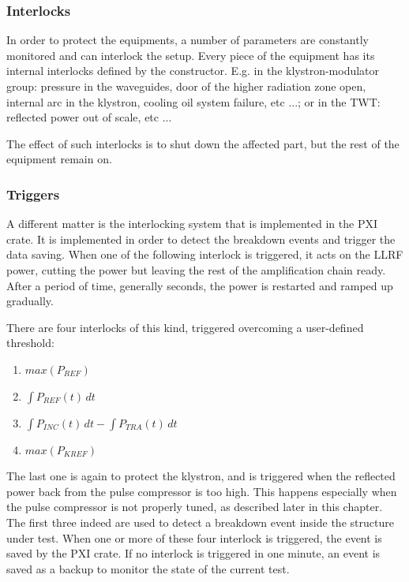 \subsubsection{Interlocks}

In order to protect the equipments, a number of parameters are constantly monitored and can interlock the setup. Every piece of the equipment has its internal interlocks defined by the constructor. E.g. in the klystron-modulator group: pressure in the waveguides, door of the higher radiation zone open, internal arc in the klystron, cooling oil system failure, etc ...; or in the TWT: reflected power out of scale, etc ... 

The effect of such interlocks is to shut down the affected part, but the rest of the equipment remain on.

\subsubsection{Triggers}

A different matter is the interlocking system that is implemented in the PXI crate. It is implemented in order to detect the breakdown events and trigger the data saving. When one of the following interlock is triggered, it acts on the LLRF power, cutting the power but leaving the rest of the amplification chain ready. After a period of time, generally seconds, the power is restarted and ramped up gradually.

 There are four interlocks of this kind, triggered overcoming a user-defined threshold:
\begin{enumerate}
\item { $max(P_{REF})$}
\item { $\int P_{REF}(t) \, dt $}
\item { $\int P_{INC}(t)\,dt - \int P_{TRA}(t)\,dt$}
\item { $max(P_{KREF})$}
\end{enumerate}
The last one is again to protect the klystron, and is triggered when the reflected power back from the pulse compressor is too high. This happens especially when the pulse compressor is not properly tuned, as described later in this chapter.
The first three indeed are used to detect a breakdown event inside the structure under test. When one or more of these four interlock is triggered, the event is saved by the PXI crate. If no interlock is triggered in one minute, an event is saved as a backup to monitor the state of the current test.

